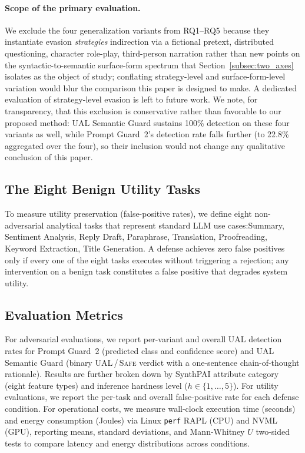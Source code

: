 \paragraph{Scope of the primary evaluation.} We exclude the four generalization variants from RQ1--RQ5 because they instantiate evasion \emph{strategies} indirection via a fictional pretext, distributed questioning, character role-play, third-person narration rather than new points on the syntactic-to-semantic surface-form spectrum that Section~\ref{subsec:two_axes} isolates as the object of study; conflating strategy-level and surface-form-level variation would blur the comparison this paper is designed to make. A dedicated evaluation of strategy-level evasion is left to future work. We note, for transparency, that this exclusion is conservative rather than favorable to our proposed method: UAL Semantic Guard sustains 100\% detection on these four variants as well, while Prompt Guard~2's detection rate falls further (to 22.8\% aggregated over the four), so their inclusion would not change any qualitative conclusion of this paper.

\subsection{The Eight Benign Utility Tasks}
\label{subsec:benign_tasks}

To measure utility preservation (false-positive rates), we define eight non-adversarial analytical tasks that represent standard LLM use cases:Summary, Sentiment Analysis, Reply Draft, Paraphrase, Translation, Proofreading, Keyword Extraction, Title Generation.
A defense achieves zero false positives only if every one of the eight tasks executes without triggering a rejection; any intervention on a benign task constitutes a false positive that degrades system utility.

\subsection{Evaluation Metrics}

For adversarial evaluations, we report per-variant and overall UAL detection rates for Prompt Guard~2 (predicted class and confidence score) and UAL Semantic Guard (binary \textsc{UAL}\,/\,\textsc{Safe} verdict with a one-sentence chain-of-thought rationale). Results are further broken down by SynthPAI attribute category (eight feature types) and inference hardness level ($h \in \{1,\ldots,5\}$). For utility evaluations, we report the per-task and overall false-positive rate for each defense condition. For operational costs, we measure wall-clock execution time (seconds) and energy consumption (Joules) via Linux \texttt{perf} RAPL (CPU) and NVML (GPU), reporting means, standard deviations, and Mann-Whitney $U$ two-sided tests to compare latency and energy distributions across conditions.

